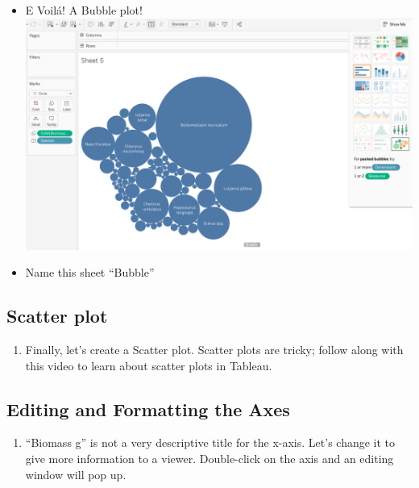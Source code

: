 \documentclass[
]{book}
\providecommand{\tightlist}{%
  \setlength{\itemsep}{0pt}\setlength{\parskip}{0pt}}
\begin{document}
\begin{enumerate}
\begin{itemize}
  \item
    E Voilá! A Bubble plot!
    \includegraphics{images/M3S2_bubble-plot.png}
  \item
    Name this sheet ``Bubble''
  \end{itemize}
\end{enumerate}

\hypertarget{scatter-plot}{%
\subsection{Scatter plot}\label{scatter-plot}}

\begin{enumerate}
\def\labelenumi{\arabic{enumi}.}
\tightlist
\item
  Finally, let's create a Scatter plot. Scatter plots are tricky; follow along with this video to learn about scatter plots in Tableau.
\end{enumerate}

\hypertarget{editing-and-formatting-the-axes}{%
\subsection{Editing and Formatting the Axes}\label{editing-and-formatting-the-axes}}

\begin{enumerate}
\def\labelenumi{\arabic{enumi}.}
\tightlist
\item
  ``Biomass g'' is not a very descriptive title for the x-axis. Let's change it to give more information to a viewer. Double-click on the axis and an editing window will pop up.
\end{enumerate}
\end{document}
